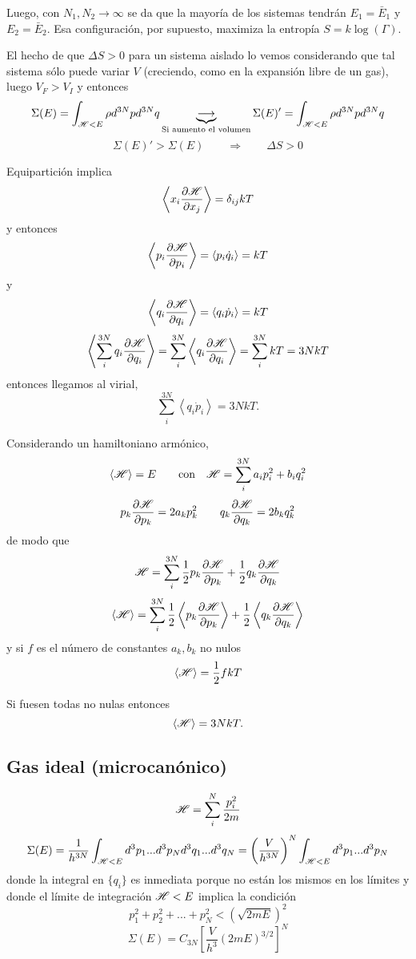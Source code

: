 \documentclass[10pt,oneside]{CBFT_book}
\begin{document}
Luego, con $N_1, N_2 \to \infty$ se da que la mayoría de los sistemas tendrán $E_1=\bar{E}_1$ y $E_2=\bar{E}_2$.
Esa configuración, por supuesto, maximiza la entropía $S=k\log(\Gamma)$.

El hecho de que $\Delta S> 0$ para un sistema aislado lo vemos considerando que tal sistema sólo puede variar
$V$ (creciendo, como en la expansión libre de un gas), luego $V_F > V_I$ y entonces
\[
	\Sigma(E) = \int_{\mathscr{H} < E} \rho d^{3N}p d^{3N}q \underbrace{\longrightarrow}_{\text{Si aumento el volumen}}
	\Sigma(E)' = \int_{\mathscr{H} < E} \rho d^{3N}p d^{3N}q
\]
\[
	\Sigma(E)' > \Sigma(E) \qquad \Rightarrow \qquad \Delta S > 0
\]

Equipartición implica 
\[
	\left< x_i \frac{\partial^{\hspace{-0.05em}} {\mathscr{H}}}{\partial {x_j}^{\hspace{-0.05em}}} \right> = \delta_{ij} k T
\]
y entonces
\[
	\left< p_i \frac{\partial^{\hspace{-0.05em}} {\mathscr{H}}}{\partial {p_i}^{\hspace{-0.05em}}} \right> = \left< p_i \dot{q}_i \right> = kT 
\]
y
\[
	\left< q_i \frac{\partial^{\hspace{-0.05em}} {\mathscr{H}}}{\partial {q_i}^{\hspace{-0.05em}}} \right> = \left< q_i \dot{p}_i \right> = kT 
\]
\[
	\left< \sum_i^{3N} q_i \frac{\partial^{\hspace{-0.05em}} {\mathscr{H}}}{\partial {q_i}^{\hspace{-0.05em}}} \right> =  \sum_i^{3N} \left< q_i \frac{\partial^{\hspace{-0.05em}} {\mathscr{H}}}{\partial {q_i}^{\hspace{-0.05em}}} \right> =
	\sum_i^{3N} k T = 3 N k T
\]
entonces llegamos al virial,
\[
	\sum_i^{3N} \left< q_i \dot{p}_i \right> = 3 N k T.
\]

Considerando un hamiltoniano armónico,
\[
	\left< \mathscr{H} \right> = E \qquad \text{con} \quad \mathscr{H} = \sum_i^{3N} a_i p_i^2 + b_i q_i^2
\]
\[
	p_k \frac{\partial^{\hspace{-0.05em}} {\mathscr{H}}}{\partial {p_k}^{\hspace{-0.05em}}} = 2 a_k p_k^2 \qquad q_k \frac{\partial^{\hspace{-0.05em}} {\mathscr{H}}}{\partial {q_k}^{\hspace{-0.05em}}} = 2 b_k q_k^2
\]
de modo que 
\[
	\mathscr{H} =  \sum_i^{3N} \frac{1}{2} p_k \frac{\partial^{\hspace{-0.05em}} {\mathscr{H}}}{\partial {p_k}^{\hspace{-0.05em}}} + \frac{1}{2} q_k \frac{\partial^{\hspace{-0.05em}} {\mathscr{H}}}{\partial {q_k}^{\hspace{-0.05em}}}
\]
\[
	\left< \mathscr{H} \right> =  \sum_i^{3N} \frac{1}{2} \left< p_k \frac{\partial^{\hspace{-0.05em}} {\mathscr{H}}}{\partial {p_k}^{\hspace{-0.05em}}}\right> +
		\frac{1}{2} \left< q_k \frac{\partial^{\hspace{-0.05em}} {\mathscr{H}}}{\partial {q_k}^{\hspace{-0.05em}}} \right>
\]
y si $f$ es el número de constantes $a_k,b_k$ no nulos
\[
	\left< \mathscr{H} \right> =  \frac{1}{2} f k T
\]

Si fuesen todas no nulas entonces
\[
	\left< \mathscr{H} \right>  = 3 N k T.
\]

\subsection{Gas ideal (microcanónico)}

\[
	\mathscr{H} =  \sum_i^{N} \frac{p^2_i}{2m}
\]
\[
	\Sigma(E) = \frac{1}{h^{3N}} \int_{\mathscr{H} < E} d^3p_1 ... d^3p_N d^3q_1 ... d^3q_N = 
	\left( \frac{V}{h^{3N}} \right)^N \int_{\mathscr{H} < E} d^3p_1 ... d^3p_N
\]
donde la integral en $\{ q_i\}$ es inmediata porque no están los mismos en los límites y donde el
límite de integración $\mathscr{H} < E$ implica la condición 
\[
	p_1^2 + p_2^2 + ... + p_N^2 < ( \sqrt{2mE} )^2
\]
\[
	\Sigma(E) = C_{3N} \left[ \frac{V}{h^3} (2mE)^{3/2}\right]^N
\]
\end{document}
